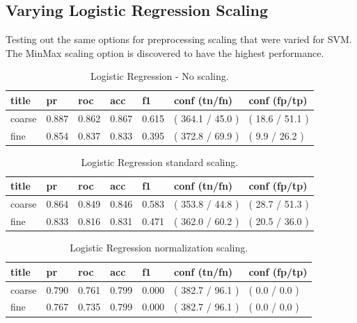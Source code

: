\documentclass[ms]{nuthesis}
\begin{document}
\subsection{Varying Logistic Regression Scaling}
\label{sect:logitParam}
\par Testing out the same options for preprocessing scaling that were varied for SVM.
The MinMax scaling option is discovered to have the highest performance.

\FloatBarrier
\begin{table}[H]
\centering
\caption{Logistic Regression - No scaling.}
\label{tab:LogRegDef}
\begin{tabular}{|l||l||l||l||l||l||l|}\toprule
title & pr & roc & acc & f1 & conf (tn/fn) & conf (fp/tp) \\ \midrule
coarse & 0.887 & 0.862 & 0.867 & 0.615 & ( 364.1 / 45.0 ) & ( 18.6 / 51.1 ) \\
fine & 0.854 & 0.837 & 0.833 & 0.395 & ( 372.8 / 69.9 ) & ( 9.9 / 26.2 ) \\ \bottomrule
\end{tabular}
\end{table}
\FloatBarrier

\FloatBarrier
\begin{table}[H]
\centering
\caption{Logistic Regression standard scaling.}
\label{tab:LogRegStandard}
\begin{tabular}{|l||l||l||l||l||l||l|}\toprule
title & pr & roc & acc & f1 & conf (tn/fn) & conf (fp/tp) \\ \midrule
coarse & 0.864 & 0.849 & 0.846 & 0.583 & ( 353.8 / 44.8 ) & ( 28.7 / 51.3 ) \\
fine & 0.833 & 0.816 & 0.831 & 0.471 & ( 362.0 / 60.2 ) & ( 20.5 / 36.0 ) \\ \bottomrule
\end{tabular}
\end{table}
\FloatBarrier

\FloatBarrier
\begin{table}[H]
\centering
\caption{Logistic Regression normalization scaling.}
\label{tab:LogRegNorm}
\begin{tabular}{|l||l||l||l||l||l||l|}\toprule
title & pr & roc & acc & f1 & conf (tn/fn) & conf (fp/tp) \\ \midrule
coarse & 0.790 & 0.761 & 0.799 & 0.000 & ( 382.7 / 96.1 ) & ( 0.0 / 0.0 ) \\
fine & 0.767 & 0.735 & 0.799 & 0.000 & ( 382.7 / 96.1 ) & ( 0.0 / 0.0 ) \\ \bottomrule
\end{tabular}
\end{table}
\FloatBarrier
\end{document}
